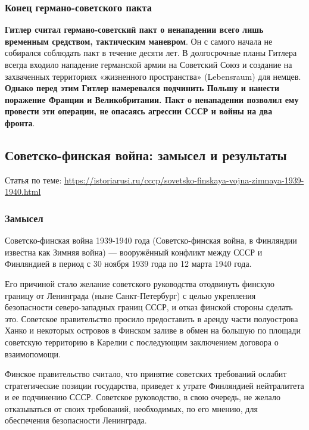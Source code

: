 \documentclass{article}
\begin{document}
\subsubsection{Конец германо-советского пакта}

\textbf{Гитлер считал германо-советский пакт о ненападении всего лишь временным средством, тактическим маневром}. Он с самого начала не собирался соблюдать пакт в течение десяти лет. В долгосрочные планы Гитлера всегда входило нападение германской армии на Советский Союз и создание на захваченных территориях «жизненного пространства» (Lebensraum) для немцев. \textbf{Однако перед этим Гитлер намеревался подчинить Польшу и нанести поражение Франции и Великобритании. Пакт о ненападении позволил ему провести эти операции, не опасаясь агрессии СССР и войны на два фронта}. 

\pagebreak
\subsection{Советско-финская война: замысел и результаты}

Статья по теме: \url{https://istoriarusi.ru/cccp/sovetsko-finskaya-vojna-zimnaya-1939-1940.html}

\subsubsection{Замысел}

Советско-финская война 1939-1940 года (Советско-финская война, в Финляндии известна как Зимняя война) — вооружённый конфликт между СССР и Финляндией в период с 30 ноября 1939 года по 12 марта 1940 года.

\hfill

Его причиной стало желание советского руководства отодвинуть финскую границу от Ленинграда (ныне Санкт-Петербург) с целью укрепления безопасности северо-западных границ СССР, и отказ финской стороны сделать это. Советское правительство просило предоставить в аренду части полуострова Ханко и некоторых островов в Финском заливе в обмен на большую по площади советскую территорию в Карелии с последующим заключением договора о взаимопомощи.

\hfill

Финское правительство считало, что принятие советских требований ослабит стратегические позиции государства, приведет к утрате Финляндией нейтралитета и ее подчинению СССР. Советское руководство, в свою очередь, не желало отказываться от своих требований, необходимых, по его мнению, для обеспечения безопасности Ленинграда.
\end{document}
